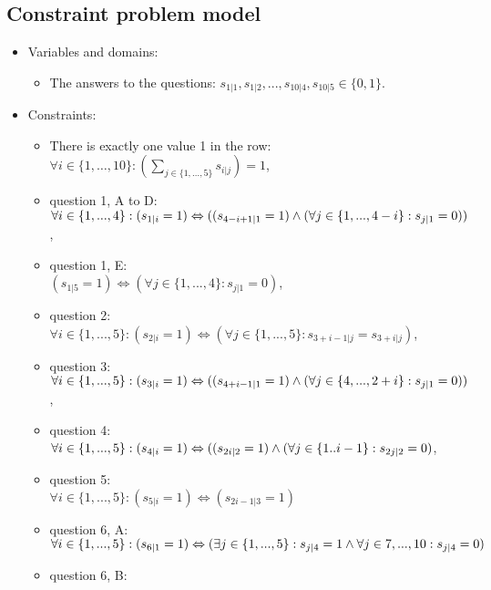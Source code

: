 \subsection{Constraint problem model}
	\begin{itemize}
  \item Variables and domains: 
    \begin{itemize}
      \item The answers to the questions: $s_{1|1}, s_{1|2}, ..., s_{10|4}, s_{10|5} \in \{0, 1\}$.
    \end{itemize}
	\item Constraints:
	 \begin{itemize}
    \item There is exactly one value 1 in the row: \\
      $\forall i \in \{1, \ldots, 10\}: \left(\sum_{j \in \{1, ..., 5\}}{s_{i|j}}\right) = 1$,
    \item question 1, A to D: \\
      $\forall i \in \{1,...,4\}: (s_{1|i} = 1) \Leftrightarrow ((s_{4-i+1|1} = 1) \wedge (\forall j \in \{1,...,4-i\}: s_{j|1} = 0))$,
    \item question 1, E: \\
      $(s_{1|5} = 1) \Leftrightarrow (\forall j \in \{1,...,4\}: s_{j|1} = 0)$,
    \item question 2: \\
      $\forall i \in \{1,...,5\}: (s_{2|i} = 1) \Leftrightarrow (\forall j \in \{1,...,5\}: s_{3+i-1|j} = s_{3+i|j})$,
    \item question 3: \\
      $\forall i \in \{1,...,5\}: (s_{3|i} = 1) \Leftrightarrow ((s_{4+i-1|1} = 1) \wedge (\forall j \in \{4,...,2+i\}: s_{j|1} = 0 ) )$,
    \item question 4: \\
      $\forall i \in \{1,...,5\}: (s_{4|i} = 1) \Leftrightarrow ((s_{2i|2} = 1) \wedge ( \forall j \in \{1..i-1\}: s_{2j|2} = 0 )$,
    \item question 5: \\
      $\forall i \in \{1,...,5\}: (s_{5|i} = 1) \Leftrightarrow (s_{2i-1|3}=1)$
    \item question 6, A: \\
      $\forall i \in \{1,...,5\}: (s_{6|1} = 1) \Leftrightarrow (\exists j \in \{1,...,5\}: s_{j|4} = 1 \wedge\\ \forall j \in {7,...,10}: s_{j|4} = 0)$
    \item question 6, B: \\

\end{itemize}
\end{itemize}
